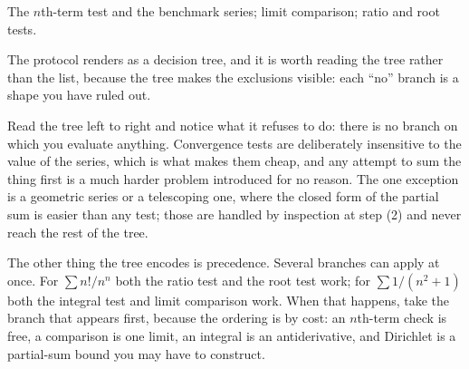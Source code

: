 \begin{seealsob}The $n$th-term test and the benchmark series; limit comparison; ratio and root tests.\end{seealsob}

The protocol renders as a decision tree, and it is worth reading the tree rather than the list, because the tree makes the exclusions visible: each ``no'' branch is a shape you have ruled out.

\begin{center}
\end{center}

Read the tree left to right and notice what it refuses to do: there is no branch on which you evaluate anything. Convergence tests are deliberately insensitive to the value of the series, which is what makes them cheap, and any attempt to sum the thing first is a much harder problem introduced for no reason. The one exception is a geometric series or a telescoping one, where the closed form of the partial sum is easier than any test; those are handled by inspection at step (2) and never reach the rest of the tree.

The other thing the tree encodes is precedence. Several branches can apply at once. For $\sum n!/n^n$ both the ratio test and the root test work; for $\sum1/(n^2+1)$ both the integral test and limit comparison work. When that happens, take the branch that appears first, because the ordering is by cost: an $n$th-term check is free, a comparison is one limit, an integral is an antiderivative, and Dirichlet is a partial-sum bound you may have to construct.

